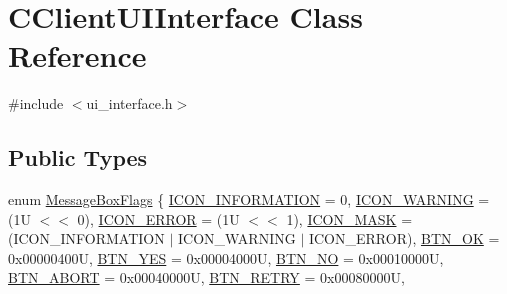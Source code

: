 \hypertarget{class_c_client_u_i_interface}{}\section{C\+Client\+U\+I\+Interface Class Reference}
\label{class_c_client_u_i_interface}


{\ttfamily \#include $<$ui\+\_\+interface.\+h$>$}

\subsection*{Public Types}
\begin{DoxyCompactItemize}
\item 
enum \mbox{\hyperlink{class_c_client_u_i_interface_a568cf07ecac3fac224d63b42a32e8bc1}{Message\+Box\+Flags}} \{ \newline
\mbox{\hyperlink{class_c_client_u_i_interface_a568cf07ecac3fac224d63b42a32e8bc1a9c1da08e2b3366c89ecf434061c2bf92}{I\+C\+O\+N\+\_\+\+I\+N\+F\+O\+R\+M\+A\+T\+I\+ON}} = 0, 
\mbox{\hyperlink{class_c_client_u_i_interface_a568cf07ecac3fac224d63b42a32e8bc1a399d1f571bc91d1eb1abb78c7e9a8426}{I\+C\+O\+N\+\_\+\+W\+A\+R\+N\+I\+NG}} = (1U $<$$<$ 0), 
\mbox{\hyperlink{class_c_client_u_i_interface_a568cf07ecac3fac224d63b42a32e8bc1a54415d26bda61103f9a08367ff6a2675}{I\+C\+O\+N\+\_\+\+E\+R\+R\+OR}} = (1U $<$$<$ 1), 
\mbox{\hyperlink{class_c_client_u_i_interface_a568cf07ecac3fac224d63b42a32e8bc1a74ba4315826bb22d61da9aa413894052}{I\+C\+O\+N\+\_\+\+M\+A\+SK}} = (I\+C\+O\+N\+\_\+\+I\+N\+F\+O\+R\+M\+A\+T\+I\+ON $\vert$ I\+C\+O\+N\+\_\+\+W\+A\+R\+N\+I\+NG $\vert$ I\+C\+O\+N\+\_\+\+E\+R\+R\+OR), 
\newline
\mbox{\hyperlink{class_c_client_u_i_interface_a568cf07ecac3fac224d63b42a32e8bc1a9874dd49edc70d5c347196ad8a631141}{B\+T\+N\+\_\+\+OK}} = 0x00000400U, 
\mbox{\hyperlink{class_c_client_u_i_interface_a568cf07ecac3fac224d63b42a32e8bc1a65395b59b20c2bec28beff89cf1ea7b3}{B\+T\+N\+\_\+\+Y\+ES}} = 0x00004000U, 
\mbox{\hyperlink{class_c_client_u_i_interface_a568cf07ecac3fac224d63b42a32e8bc1abc6f3d18af663a338d9a3a89dd65acaa}{B\+T\+N\+\_\+\+NO}} = 0x00010000U, 
\mbox{\hyperlink{class_c_client_u_i_interface_a568cf07ecac3fac224d63b42a32e8bc1a111f038c73aecac1e6772fe84ab102f3}{B\+T\+N\+\_\+\+A\+B\+O\+RT}} = 0x00040000U, 
\newline
\mbox{\hyperlink{class_c_client_u_i_interface_a568cf07ecac3fac224d63b42a32e8bc1af45dfc06c4320e666df48862af00ce8e}{B\+T\+N\+\_\+\+R\+E\+T\+RY}} = 0x00080000U, 

\end{DoxyCompactItemize}
